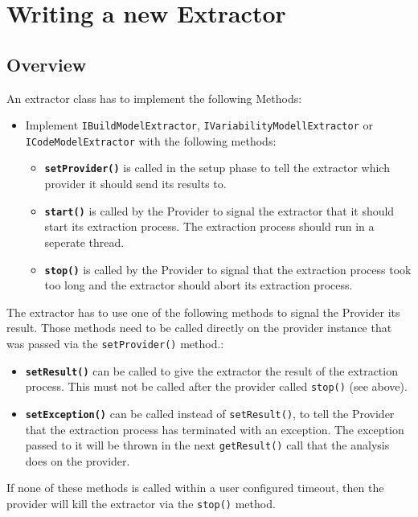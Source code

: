 \chapter{Writing a new Extractor}
 
\section{Overview}

An extractor class has to implement the following Methods:
\begin{itemize}
    \item Implement \texttt{IBuildModelExtractor}, \texttt{IVariabilityModellExtractor} or \newline \texttt{ICodeModelExtractor} with the following methods:
    \begin{itemize}
        \item \textbf{\texttt{setProvider()}} is called in the setup phase to tell the extractor which provider it should send its results to.
        \item \textbf{\texttt{start()}} is called by the Provider to signal the extractor that it should start its extraction process. The extraction process should run in a seperate thread.
        \item \textbf{\texttt{stop()}} is called by the Provider to signal that the extraction process took too long and the extractor should abort its extraction process.
    \end{itemize}
\end{itemize}

The extractor has to use one of the following methods to signal the Provider its result. Those methods need to be called directly on the provider instance that was passed via the \texttt{setProvider()} method.:
\begin{itemize}
    \item \textbf{\texttt{setResult()}} can be called to give the extractor the result of the extraction process. This must not be called after the provider called \texttt{stop()} (see above).
    \item \textbf{\texttt{setException()}} can be called instead of \texttt{setResult()}, to tell the Provider that the extraction process has terminated with an exception. The exception passed to it will be thrown in the next \texttt{getResult()} call that the analysis does on the provider.
\end{itemize}

If none of these methods is called within a user configured timeout, then the provider will kill the extractor via the \texttt{stop()} method.

